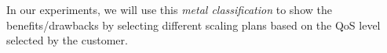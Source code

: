In our experiments, we will use this \emph{metal classification} to show the benefits/drawbacks by selecting different scaling plans based on the QoS level selected by the customer.











